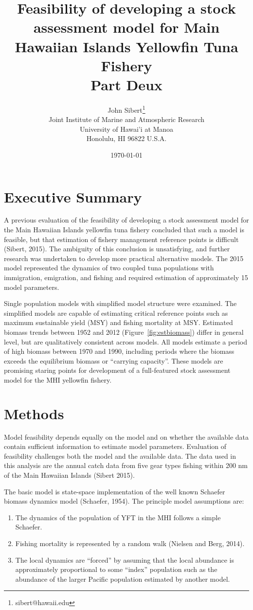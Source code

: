 \documentclass[12pt,letterpaper,twoside]{article}
\title{Feasibility of developing a stock assessment model for Main
Hawaiian Islands Yellowfin Tuna Fishery\\
\vspace{2ex}
Part Deux}
\author{
John Sibert\thanks{sibert@hawaii.edu}\\
Joint Institute of Marine and Atmospheric Research\\
University of Hawai'i at Manoa\\
Honolulu, HI  96822 U.S.A.\\[0.125in]
\date{\today}
}
\newcommand\doublespacing{\baselineskip=1.6\normalbaselineskip}
\begin{document}
\maketitle



\section{Executive Summary}
A previous evaluation of the feasibility of developing a
stock assessment model for the Main Hawaiian Islands yellowfin tuna
fishery concluded that such a model is feasible, but that estimation of
fishery management reference points is difficult (Sibert, 2015).
The ambiguity of this
conclusion is unsatisfying, and further research was undertaken to
develop more practical alternative models. 
The 2015 model represented
the dynamics of two coupled tuna populations with immigration,
emigration, and fishing and required estimation of approximately 15
model parameters.

Single population models with simplified model
structure
were examined. The simplified models are capable of
estimating critical reference points such as maximum sustainable
yield (MSY) and fishing mortality at MSY. 
Estimated biomass trends between 1952 and 2012 
(Figure~\ref{fig:estbiomass}) differ in general level, but are
qualitatively consistent across models. All models estimate a period of high
biomass between 1970 and 1990, 
including periods where the biomass exceeds the
equilibrium biomass or ``carrying capacity''. 
These models are
promising staring points for development of a full-featured stock
assessment model for the MHI yellowfin fishery.

\section{Methods}
Model feasibility depends equally on the model and on whether the
available data
contain sufficient information to estimate model parameters.
Evaluation of feasibility challenges both the model and the available
data. The data used in this analysis are the annual catch data from
five gear types fishing within 200 nm of the Main Hawaiian Islands
(Sibert 2015).

The basic model is  state-space implementation of the well known
Schaefer biomass dynamics model (Schaefer, 1954).
The principle model assumptions are:
\begin{enumerate}
\item The dynamics of the population of YFT in the MHI follows a
simple Schaefer.
\item Fishing mortality is represented by a random walk (Nielsen and
Berg, 2014).
\item The local dynamics are ``forced'' by assuming that the local
abundance is approximately proportional to some ``index'' population
such as the abundance of the larger Pacific population estimated by
another model.
\end{enumerate}
\end{document}
